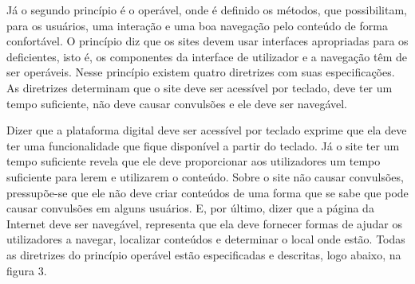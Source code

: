 \documentclass[a4paper]{article}
\begin{document}
\begin{titlepage}
Já o segundo princípio é o operável, onde é definido os métodos, que possibilitam, para os usuários, uma interação e uma boa navegação pelo conteúdo de forma confortável. O princípio diz que os sites devem usar interfaces apropriadas para os deficientes, isto é, os componentes da interface de utilizador e a navegação têm de ser operáveis. Nesse princípio existem quatro diretrizes com suas especificações. As diretrizes determinam que o site deve ser acessível por teclado, deve ter um tempo suficiente, não deve causar convulsões e ele deve ser navegável.

Dizer que a plataforma digital deve ser acessível por teclado exprime que ela deve ter uma funcionalidade que fique disponível a partir do teclado. Já o site ter um tempo suficiente revela que ele deve proporcionar aos utilizadores um tempo suficiente para lerem e utilizarem o conteúdo. Sobre o site não causar convulsões, pressupõe-se que ele não deve criar conteúdos de uma forma que se sabe que pode causar convulsões em alguns usuários. E, por último, dizer que a página da Internet deve ser navegável, representa que ela deve fornecer formas de ajudar os utilizadores a navegar, localizar conteúdos e determinar o local onde estão. Todas as diretrizes do princípio operável estão especificadas e descritas, logo abaixo, na figura 3.\\


\end{titlepage}
\end{document}
